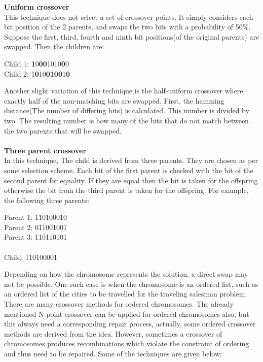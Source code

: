 \documentclass[a4paper, 12pt]{article}
\begin{document}
\textbf{Uniform crossover}\\
This technique does not select a set of crossover points. It simply considers each bit position of the 2 parents, and swaps the two bits with
a probability of 50\%. Suppose the first, third, fourth and ninth bit positions(of the original parents) are swapped. Then the children are:
\begin{center}
Child 1: \textbf{1}0\textbf{00}1010\textbf{0}0\\
Child 2: 1\textbf{0}10\textbf{0100}1\textbf{0}
\end{center}
Another slight variation of this technique is the half-uniform crossover where exactly half of the non-matching bits are swapped. First, the 
hamming distance(The number of differing bits) is calculated. This number is divided by two. The resulting number is how many of the bits
that do not match between the two parents that will be swapped.\\~\\
\textbf{Three parent crossover}\\
In this technique, The child is derived from three parents. They are chosen as per some selection scheme. Each bit of the first parent is
checked with the bit of the second parent for equality. If they are equal then the bit is taken for the offspring otherwise the bit from the
third parent is taken for the offspring. For example, the following three parents:
\begin{center}
Parent 1: 110100010\\
Parent 2: 011001001\\
Parent 3: 110110101\\~\\
Child: 110100001
\end{center}
Depending on how the chromosome represents the solution, a direct swap may not be possible. One such case is when the chromosome is an ordered list, such as an ordered list of the cities to be travelled for the traveling salesman problem. There are many crossover methods for ordered chromosomes. The already mentioned N-point crossover can be applied for ordered chromosomes also, but this always need a corresponding repair process, actually, some ordered crossover methods are derived from the idea. However, sometimes a crossover of chromosomes produces recombinations which violate the constraint of ordering and thus need to be repaired. Some of the techniques are given below:
\end{document}
